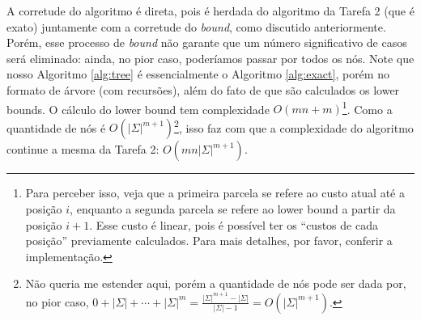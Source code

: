 A corretude do algoritmo é direta, pois é herdada do algoritmo da Tarefa 2 (que é exato) juntamente com a corretude do \textit{bound}, como discutido anteriormente. Porém, esse processo de \textit{bound} não garante que um número significativo de casos será eliminado: ainda, no pior caso, poderíamos passar por todos os nós.
Note que nosso Algoritmo \ref{alg:tree} é essencialmente o Algoritmo \ref{alg:exact}, porém no formato de árvore (com recursões), além do fato de que são calculados os lower bounds. O cálculo do lower bound tem complexidade $O(mn + m)$\footnote{Para perceber isso, veja que a primeira parcela se refere ao custo atual até a posição $i$, enquanto a segunda parcela se refere ao lower bound a partir da posição $i+1$. Esse custo é linear, pois é possível ter os ``custos de cada posição'' previamente calculados. Para mais detalhes, por favor, conferir a implementação.}.
Como a quantidade de nós é $O(|\Sigma|^{m+1})$\footnote{Não queria me estender aqui, porém a quantidade de nós pode ser dada por, no pior caso, $0 + |\Sigma| + \cdots + |\Sigma|^m = \frac{|\Sigma|^{m+1}-|\Sigma|}{|\Sigma| - 1} = O(|\Sigma|^{m+1})$.}, isso faz com que a complexidade do algoritmo continue a mesma da Tarefa 2: $O(mn|\Sigma|^{m+1})$.
